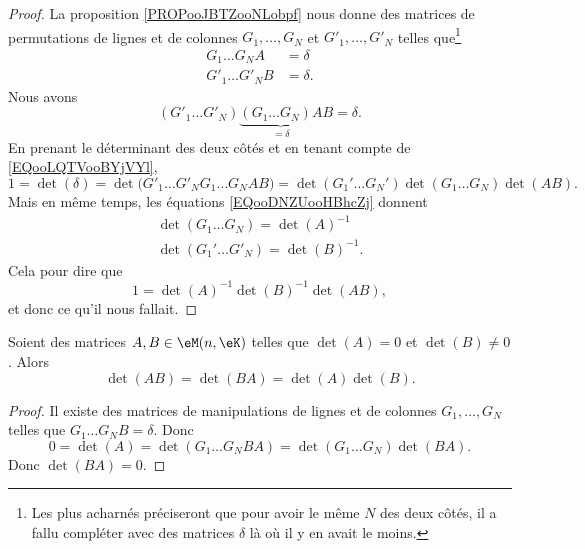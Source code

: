 \begin{proof}
    La proposition \ref{PROPooJBTZooNLobpf} nous donne des matrices de permutations de lignes et de colonnes \( G_1,\ldots, G_N\) et \( G'_1,\ldots, G'_N\) telles que\footnote{Les plus acharnés préciseront que pour avoir le même \( N\) des deux côtés, il a fallu compléter avec des matrices \( \delta\) là où il y en avait le moins.}
    \begin{subequations}        \label{EQooDNZUooHBhcZj}
        \begin{align}
            G_1\ldots G_NA&=\delta\\
            G'_1\ldots G'_NB&=\delta.
        \end{align}
    \end{subequations}
    Nous avons
    \begin{equation}
        (G'_1\ldots G'_N)\underbrace{(G_1\ldots G_N)A}_{=\delta}B=\delta.
    \end{equation}
    En prenant le déterminant des deux côtés et en tenant compte de \eqref{EQooLQTVooBYjVYl},
    \begin{equation}
        1=\det(\delta)=\det\big(  G'_1\ldots G'_NG_1\ldots G_NAB\big)=\det(G_1'\ldots G_N')\det(G_1\ldots G_N)\det(AB).
    \end{equation}
    Mais en même temps, les équations \ref{EQooDNZUooHBhcZj} donnent
    \begin{subequations}
        \begin{align}
            \det(G_1\ldots G_N)=\det(A)^{-1}\\
            \det(G_1'\ldots G'_N)=\det(B)^{-1}.
        \end{align}
    \end{subequations}
    Cela pour dire que
    \begin{equation}
        1=\det(A)^{-1}\det(B)^{-1}\det(AB),
    \end{equation}
    et donc ce qu'il nous fallait.
\end{proof}

\begin{proposition}     \label{PROPooWVJFooTmqoec}
    Soient des matrices \( A,B\in \eM(n,\eK)\) telles que \( \det(A)=0\) et \( \det(B)\neq0\). Alors
    \begin{equation}
        \det(AB)=\det(BA)=\det(A)\det(B).
    \end{equation}
\end{proposition}

\begin{proof}
    Il existe des matrices de manipulations de lignes et de colonnes \( G_1,\ldots, G_N\) telles que \( G_1\ldots G_NB=\delta\). Donc
    \begin{equation}
        0=\det(A)=\det(G_1\ldots G_NBA)=\det(G_1\ldots G_N)\det(BA).
    \end{equation}
    Donc \( \det(BA)=0\).
\end{proof}

